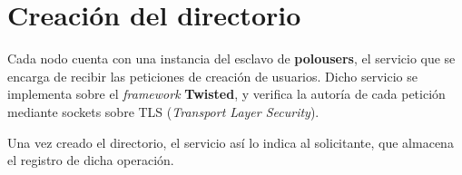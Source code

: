 \documentclass{article}
\begin{document}
\section{Creación del directorio}

Cada nodo cuenta con una instancia del esclavo de \textbf{polousers}, el servicio que se encarga de recibir las peticiones de creación de usuarios. Dicho servicio se implementa sobre el \textit{framework} \textbf{Twisted}, y verifica la autoría de cada petición mediante sockets sobre TLS (\textit{Transport Layer Security}).

Una vez creado el directorio, el servicio así lo indica al solicitante, que almacena el registro de dicha operación.


\label{Referencias}
\end{document}

